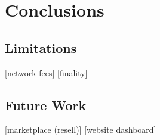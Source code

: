\chapter{Conclusions}

\section{Limitations}
 [network fees]
 [finality]

\section{Future Work}

 [marketplace (resell)]
 [website dashboard]